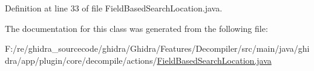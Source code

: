 Definition at line 33 of file Field\+Based\+Search\+Location.\+java.



The documentation for this class was generated from the following file\+:\begin{DoxyCompactItemize}
\item 
F\+:/re/ghidra\+\_\+sourcecode/ghidra/\+Ghidra/\+Features/\+Decompiler/src/main/java/ghidra/app/plugin/core/decompile/actions/\mbox{\hyperlink{_field_based_search_location_8java}{Field\+Based\+Search\+Location.\+java}}\end{DoxyCompactItemize}
